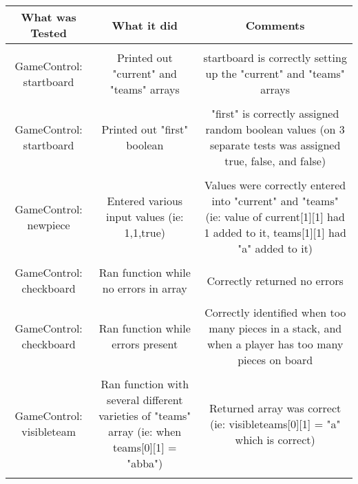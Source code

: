 \documentclass[12pt]{article}
\begin{document}
	\begin{tabularx}{\linewidth}{|C|C|C|}
		What was Tested & What it did & Comments \\
		\hline \\
		GameControl: startboard & Printed out "current" and "teams" arrays & startboard is correctly setting up the "current" and "teams" arrays \\
		\hline \\
		GameControl: startboard & Printed out "first" boolean & "first" is correctly assigned random boolean values (on 3 separate tests was assigned true, false, and false) \\
		\hline \\
		GameControl: newpiece & Entered various input values (ie: 1,1,true) & Values were correctly entered into "current" and "teams" (ie: value of current[1][1] had 1 added to it, teams[1][1] had "a" added to it) \\
		\hline \\
		GameControl: checkboard & Ran function while no errors in array & Correctly returned no errors \\
		\hline \\
		GameControl: checkboard & Ran function while errors present & Correctly identified when too many pieces in a stack, and when a player has too many pieces on board \\
		\hline \\
		GameControl: visibleteam & Ran function with several different varieties of "teams" array (ie: when teams[0][1] = "abba") & Returned array was correct (ie: visibleteams[0][1] = "a" which is correct) \\
		\hline \\
	\end{tabularx}
	
\end{document}
